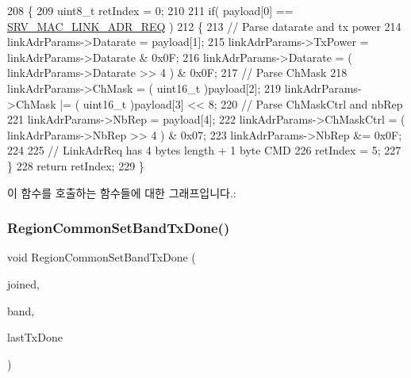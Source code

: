 \begin{DoxyCode}
208 \{
209     uint8\_t retIndex = 0;
210 
211     \textcolor{keywordflow}{if}( payload[0] == \mbox{\hyperlink{group___l_o_r_a_m_a_c_ggac91cc4dc69ad7de2426360f9f1f2d079af7fc388963e2bb713062bd51960ed4cc}{SRV\_MAC\_LINK\_ADR\_REQ}} )
212     \{
213         \textcolor{comment}{// Parse datarate and tx power}
214         linkAdrParams->Datarate = payload[1];
215         linkAdrParams->TxPower = linkAdrParams->Datarate & 0x0F;
216         linkAdrParams->Datarate = ( linkAdrParams->Datarate >> 4 ) & 0x0F;
217         \textcolor{comment}{// Parse ChMask}
218         linkAdrParams->ChMask = ( uint16\_t )payload[2];
219         linkAdrParams->ChMask |= ( uint16\_t )payload[3] << 8;
220         \textcolor{comment}{// Parse ChMaskCtrl and nbRep}
221         linkAdrParams->NbRep = payload[4];
222         linkAdrParams->ChMaskCtrl = ( linkAdrParams->NbRep >> 4 ) & 0x07;
223         linkAdrParams->NbRep &= 0x0F;
224 
225         \textcolor{comment}{// LinkAdrReq has 4 bytes length + 1 byte CMD}
226         retIndex = 5;
227     \}
228     \textcolor{keywordflow}{return} retIndex;
229 \}
\end{DoxyCode}
이 함수를 호출하는 함수들에 대한 그래프입니다.\+:
\mbox{\label{group___r_e_g_i_o_n_c_o_m_m_o_n_ga491dea5590228a0cd33affd71743779c}} 
\subsubsection{\texorpdfstring{Region\+Common\+Set\+Band\+Tx\+Done()}{RegionCommonSetBandTxDone()}}
{\footnotesize\ttfamily void Region\+Common\+Set\+Band\+Tx\+Done (\begin{DoxyParamCaption}\item[{bool}]{joined,  }\item[{\mbox{\hyperlink{group___l_o_r_a_m_a_c_ga8f49721ee96ceb52c80a896ab11a2ed8}{Band\+\_\+t}} $\ast$}]{band,  }\item[{\mbox{\hyperlink{utilities_8h_a4215ca43d3e953099ea758ce428599d0}{Timer\+Time\+\_\+t}}}]{last\+Tx\+Done }\end{DoxyParamCaption})}



